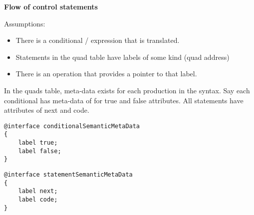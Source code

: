 \begin{center}
\begin{Large}
\textbf{Flow of control statements}
\end{Large}
 \end{center}
 Assumptions:
\begin {itemize}
\item There is a conditional / expression that is translated.
\item Statements in the quad table have labels of some kind (quad address)
\item There is an operation that provides a pointer to that label.  
\end{itemize}

In the quads table, meta-data exists for each production in the syntax.  Say each conditional has meta-data of for true and false attributes.  All statements have attributes of next and code.  

\begin{lstlisting}
@interface conditionalSemanticMetaData
{
	label true;
	label false;
}
\end{lstlisting}

\begin{lstlisting}
@interface statementSemanticMetaData
{
	label next;
	label code;
}
\end{lstlisting}

